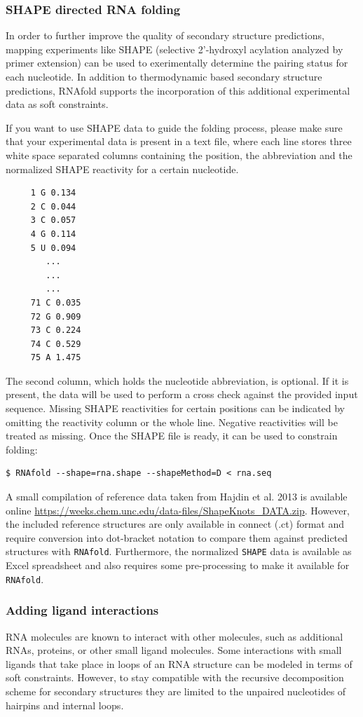 \documentclass[a4paper]{article}
\begin{document}
\subsubsection{SHAPE directed RNA folding}

In order to further improve the quality of secondary structure predictions, mapping experiments like
SHAPE (selective 2'-hydroxyl acylation analyzed by primer extension) can be used to exerimentally determine
the pairing status for each nucleotide.
In addition to thermodynamic based secondary structure predictions, RNAfold supports the incorporation of this additional
experimental data as soft constraints.

If you want to use SHAPE data to guide the folding process, please make sure that your experimental data is present in a text file,
where each line stores three white space separated columns containing the position, the abbreviation and the normalized SHAPE reactivity for
a certain nucleotide.

\begin{verbatim}
     1 G 0.134
     2 C 0.044
     3 C 0.057
     4 G 0.114
     5 U 0.094
        ...
        ...
        ...
     71 C 0.035
     72 G 0.909
     73 C 0.224
     74 C 0.529
     75 A 1.475
\end{verbatim}%

The second column, which holds the nucleotide abbreviation, is optional.
If it is present, the data will be used to perform a cross check against the provided input sequence.
Missing SHAPE reactivities for certain positions can be indicated by omitting the reactivity column or the whole line.
Negative reactivities will be treated as missing.
Once the SHAPE file is ready, it can be used to constrain folding:

\begin{verbatim}
$ RNAfold --shape=rna.shape --shapeMethod=D < rna.seq
\end{verbatim}%

A small compilation of reference data taken from Hajdin et al. 2013 is available online
\url{https://weeks.chem.unc.edu/data-files/ShapeKnots_DATA.zip}. However, the included
reference structures are only available in connect (.ct) format and require conversion into
dot-bracket notation to compare them against predicted structures with \texttt{RNAfold}.
Furthermore, the normalized \texttt{SHAPE} data is available as Excel spreadsheet and
also requires some pre-processing to make it available for \texttt{RNAfold}.


\subsubsection{Adding ligand interactions}
RNA molecules are known to interact with other molecules, such as additional RNAs, proteins,
or other small ligand molecules. Some interactions with small ligands that take place in
loops of an RNA structure can be modeled in terms of soft constraints. However, to stay
compatible with the recursive decomposition scheme for secondary structures they are
limited to the unpaired nucleotides of hairpins and internal loops.
\end{document}
